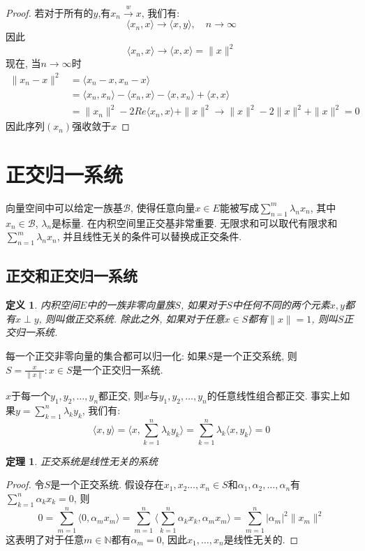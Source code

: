 \documentclass[a4paper,11pt]{book}
\newtheorem{definition}{\hspace{2em}定义}[section]
\newtheorem{theorem}{\hspace{2em}定理}[section]
\newtheorem{proof}{证明}[section]
\begin{document}
\begin{proof}
  若对于所有的$y$,有$x_n\stackrel{w}{\to}x$, 我们有:
  \begin{equation*}
    \langle x_n,x\rangle\to\langle x,y\rangle,\quad n\to\infty
  \end{equation*}
  因此
  \begin{equation*}
    \langle x_n,x\rangle\to\langle x,x\rangle=\|x\|^2
  \end{equation*}
  现在, 当$n\to\infty$时
  \begin{equation*}
    \begin{split}
       \|x_n-x\|^2 & =\langle x_n-x,x_n-x\rangle \\
         & =\langle x_n,x_n\rangle-\langle x_n,x\rangle-\langle x,x_n\rangle+\langle x,x\rangle \\
         & =\|x_n\|^2-2Re\langle x_n,x\rangle+\|x\|^2\to\|x\|^2-2\|x\|^2+\|x\|^2=0
    \end{split}
  \end{equation*}
  因此序列$(x_n)$强收敛于$x$
\end{proof}
\section{正交归一系统}
向量空间中可以给定一族基$\mathcal{B}$, 使得任意向量$x\in E$能被写成$\sum_{n=1}^{m}\lambda_nx_n$, 其中$x_n\in \mathcal{B}$, $\lambda_n$是标量. 在内积空间里正交基非常重要. 无限求和可以取代有限求和$\sum_{n=1}^{m}\lambda_nx_n$, 并且线性无关的条件可以替换成正交条件.
\subsection*{正交和正交归一系统}
\begin{definition}
  内积空间$E$中的一族非零向量族$S$, 如果对于$S$中任何不同的两个元素$x,y$都有$x\perp y$, 则叫做正交系统. 除此之外, 如果对于任意$x\in S$都有$\|x\|=1$, 则叫$S$正交归一系统.
\end{definition}
每一个正交非零向量的集合都可以归一化: 如果$S$是一个正交系统, 则$S={\frac{x}{\|x\|}:x\in S}$是一个正交归一系统.

$x$于每一个$y_1,y_2,\dots,y_n$都正交, 则$x$与$y_1,y_2,\dots,y_n$的任意线性组合都正交. 事实上如果$y=\sum_{k=1}^{n}\lambda_ky_k$, 我们有:
\begin{equation*}
  \langle x,y\rangle=\langle x,\sum_{k=1}^{n}\lambda_ky_k\rangle=\sum_{k=1}^{n}\lambda_k\langle x,y_k\rangle=0
\end{equation*}
\begin{theorem}
  正交系统是线性无关的系统
\end{theorem}
\begin{proof}
  令$S$是一个正交系统. 假设存在$x_1,x_2\dots,x_n\in S$和$\alpha_1,\alpha_2,\dots,\alpha_n$有$\sum_{k=1}^{n}\alpha_kx_k=0$, 则
  \begin{equation*}
    0=\sum_{m=1}^{n}\langle0,\alpha_mx_m\rangle=\sum_{m=1}^{n}\langle\sum_{k=1}^{n}\alpha_kx_k,\alpha_mx_m\rangle=\sum_{m=1}^{n}|\alpha_m|^2\|x_m\|^2
  \end{equation*}
  这表明了对于任意$m\in \mathbb{N}$都有$\alpha_m=0$, 因此$x_1,\dots,x_n$是线性无关的.
\end{proof}
\end{document}

